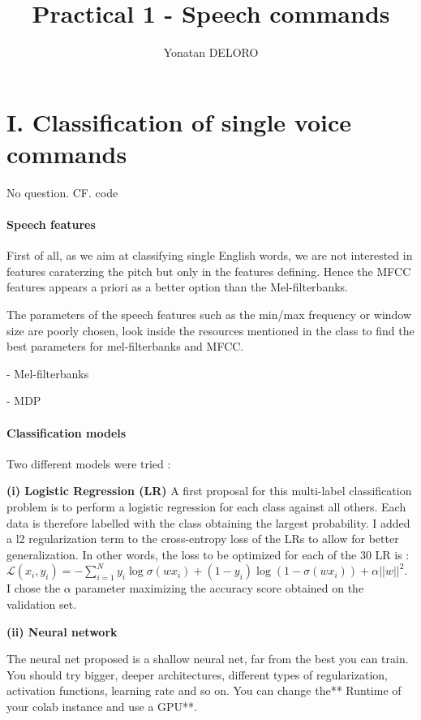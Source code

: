 \documentclass[11pt]{article}
\title{Practical 1 - Speech commands}
\author{Yonatan DELORO}
\begin{document}
\maketitle


\section{I. Classification of single voice commands}

No question. CF. code

\paragraph{Speech features}

First of all, as we aim at classifying single English words, we are not interested in features caraterzing the pitch but only in the features defining. Hence the MFCC features appears a priori as a better option than the Mel-filterbanks.

The parameters of the speech features such as the min/max frequency or window size are poorly chosen, look inside the resources mentioned in the class to find the best parameters for mel-filterbanks and MFCC.

- Mel-filterbanks

- MDP

\paragraph{Classification models} Two different models were tried : 

\textbf{(i) Logistic Regression (LR)} A first proposal for this multi-label classification problem is to perform a logistic regression for each class against all others. Each data is therefore labelled with the class obtaining the largest probability. I added a l2 regularization term to the cross-entropy loss of the LRs to allow for better generalization. In other words, the loss to be optimized for each of the $30$ LR is : $\mathcal{L}(x_i,y_i) = - \sum_{i=1}^N y_i \log \sigma(w x_i) + (1-y_i) \log (1-\sigma(w x_i)) + \alpha ||w||^2$. I chose the $\alpha$ parameter maximizing the accuracy score obtained on the validation set.

\textbf{(ii) Neural network}

The neural net proposed is a shallow neural net, far from the best you can train. You should try bigger, deeper architectures, different types of regularization, activation functions, learning rate and so on. You can change the** Runtime of your colab instance and use a GPU**.
\end{document}
